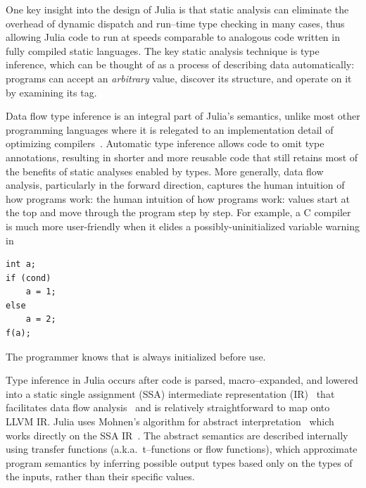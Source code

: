 \documentclass[pldi]{sigplanconf-pldi15}
\begin{document}
One key insight into the design of Julia is that static analysis can eliminate
the overhead of dynamic dispatch and run--time type checking in many cases,
thus allowing Julia code to run at speeds comparable to analogous code written
in fully compiled static languages. The key static analysis technique is type
inference, which can be thought of as a process of describing data
automatically: programs can accept an \emph{arbitrary} value, discover its
structure, and operate on it by examining its tag.

Data flow type inference is an integral part of Julia's semantics, unlike most
other programming languages where it is relegated to an implementation detail
of optimizing compilers~\cite{Nielson2005,Khedker2009}. Automatic type
inference allows code to omit type annotations, resulting in shorter and more
reusable code that still retains most of the benefits of static analyses
enabled by types. More generally, data flow analysis, particularly in the
forward direction, captures the human intuition of how programs work: the human
intuition of how programs work: values start at the top and move through the
program step by step. For example, a C compiler is much more user-friendly when
it elides a possibly-uninitialized variable warning in

\begin{lstlisting}
int a;
if (cond)
    a = 1;
else
    a = 2;
f(a);
\end{lstlisting}
%
The programmer knows that  is always initialized before use.

Type inference in Julia occurs after code is parsed, macro--expanded, and
lowered into a static single assignment (SSA) intermediate representation
(IR)~\cite{Alpern1988,Rosen1988} that facilitates data flow
analysis~\cite{Cousot1977,Cousot2000,Nielson2005} and is relatively
straightforward to map onto LLVM IR. Julia uses Mohnen's algorithm
for abstract interpretation~\cite{Cousot1992} which works directly on the SSA
IR~\cite{Mohnen2002}. The abstract semantics are described internally using
transfer functions (a.k.a.\ t--functions or flow functions), which approximate
program semantics by inferring possible output types based only on the types of
the inputs, rather than their specific values. 
\end{document}

